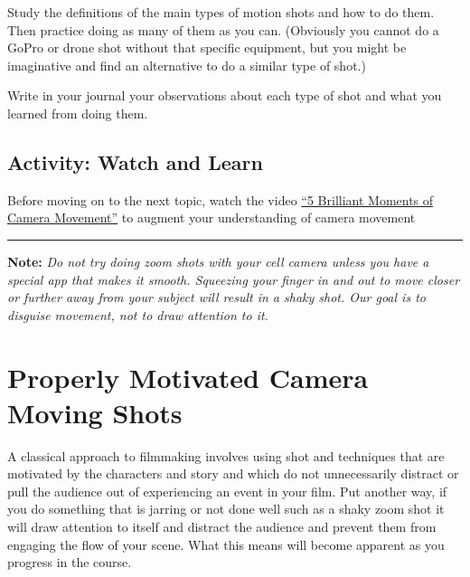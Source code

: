 \documentclass[
]{book}
\begin{document}
\begin{reflect}
Study the definitions of the main types of motion shots and how to do them. Then practice doing as many of them as you can. (Obviously you cannot do a GoPro or drone shot without that specific equipment, but you might be imaginative and find an alternative to do a similar type of shot.)

Write in your journal your observations about each type of shot and what you learned from doing them.
\end{reflect}

\hypertarget{activity-watch-and-learn}{%
\subsection*{Activity: Watch and Learn}\label{activity-watch-and-learn}}

\begin{reflect}
Before moving on to the next topic, watch the video \href{https://www.youtube.com/watch?v=h2c3JZ6X3f8}{``5 Brilliant Moments of Camera Movement''} to augment your understanding of camera movement

\begin{center}\rule{0.5\linewidth}{0.5pt}\end{center}

\textbf{Note:} \emph{Do not try doing zoom shots with your cell camera unless you have a special app that makes it smooth. Squeezing your finger in and out to move closer or further away from your subject will result in a shaky shot. Our goal is to disguise movement, not to draw attention to it.}
\end{reflect}

\hypertarget{properly-motivated-camera-moving-shots}{%
\section{Properly Motivated Camera Moving Shots}\label{properly-motivated-camera-moving-shots}}

A classical approach to filmmaking involves using shot and techniques that are motivated by the characters and story and which do not unnecessarily distract or pull the audience out of experiencing an event in your film. Put another way, if you do something that is jarring or not done well such as a shaky zoom shot it will draw attention to itself and distract the audience and prevent them from engaging the flow of your scene. What this means will become apparent as you progress in the course.
\end{document}
